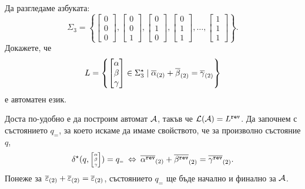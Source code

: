 \begin{extra2}
\begin{problem}
  Да разгледаме азбуката:
  \[\Sigma_3 = \left\{\begin{bmatrix} 0\\0\\0\end{bmatrix},\begin{bmatrix} 0\\0\\1\end{bmatrix},\begin{bmatrix} 0\\1\\0\end{bmatrix},\begin{bmatrix} 0\\1\\1\end{bmatrix},\dots,\begin{bmatrix} 1\\1\\1\end{bmatrix}\right\}.\]
  Докажете, че 
  \[L = \left\{\begin{bmatrix} \alpha\\\beta\\\gamma\end{bmatrix} \in \Sigma^\star_3 \mid \overline{\alpha}_{(2)}+\overline{\beta}_{(2)} = \overline{\gamma}_{(2)}\right\}\]
  е автоматен език.
\end{problem}
\ifhints
\begin{hint}
  Доста по-удобно е да построим автомат $\mathcal{A}$, такъв че $\mathcal{L}(\mathcal{A}) = L^{\texttt{rev}}$.
  Да започнем с състоянието $q_{\scriptscriptstyle{=}}$, за което искаме да имаме свойството, че за произволно състояние $q$,
  \[\delta^\star(q, \tiny{ \begin{bmatrix} \alpha\\ \beta \\ \gamma\end{bmatrix} }) = q_{\scriptscriptstyle{=}}  \ \Leftrightarrow\  \overline{\alpha^{\texttt{rev}}}_{(2)} + \overline{\beta^{\texttt{rev}}}_{(2)} = \overline{\gamma^{\texttt{rev}}}_{(2)}.\]
  Понеже за $\overline{\varepsilon}_{(2)} + \overline{\varepsilon}_{(2)} = \overline{\varepsilon}_{(2)}$, състоянието $q_{\scriptscriptstyle{=}}$ ще бъде начално и финално за $\mathcal{A}$.


\end{hint}
\end{extra2}
